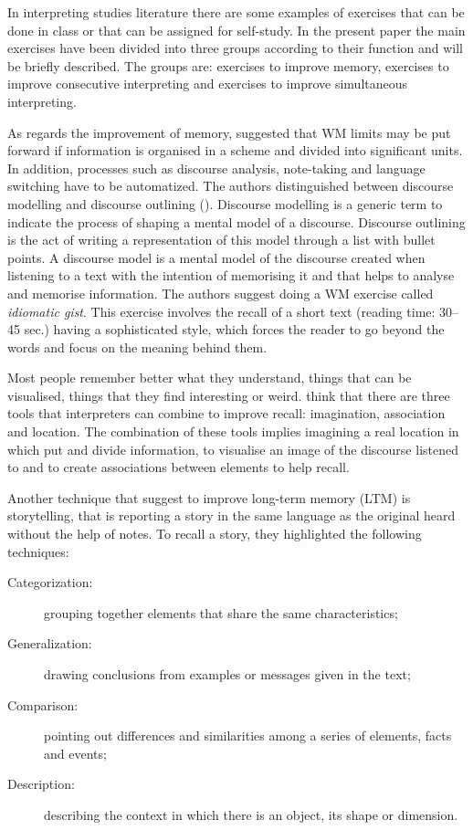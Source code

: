 \documentclass[output=paper]{../langscibook}
\begin{document}
In interpreting studies literature there are some examples of exercises that can be done in class or that can be assigned for self-study. In the present paper the main exercises have been divided into three groups according to their function and will be briefly described. The groups are: exercises to improve memory, exercises to improve consecutive interpreting and exercises to improve simultaneous interpreting.

As regards the improvement of memory, \citet{SettonDawrant2016b} suggested that WM limits may be put forward if information is organised in a scheme and divided into significant units. In addition, processes such as discourse analysis, note-taking and language switching have to be automatized. The authors distinguished between discourse modelling and discourse outlining (\citealt{SettonDawrant2016a}). Discourse modelling is a generic term to indicate the process of shaping a mental model of a discourse. Discourse outlining is the act of writing a representation of this model through a list with bullet points. A discourse model is a mental model of the discourse created when listening to a text with the intention of memorising it and that helps to analyse and memorise information. The authors suggest doing a WM  exercise called \emph{idiomatic gist}. This exercise involves the recall of a short text (reading time: 30--45 sec.) having a sophisticated style, which forces the reader to go beyond the words and focus on the meaning behind them.

Most people remember better what they understand, things that can be visualised, things that they find interesting or weird. \citet{YenkimalekivanHeuven2013,YenkimalekivanHeuven2017} think that there are three tools that interpreters can combine to improve recall: imagination, association and location. The combination of these tools implies imagining a real location in which put and divide information, to visualise an image of the discourse listened to and to create associations between elements to help recall.

Another technique that \citet{YenkimalekivanHeuven2013,YenkimalekivanHeuven2017} suggest to improve long-term memory (LTM) is storytelling, that is reporting a story in the same language as the original heard without the help of notes. To recall a story, they highlighted the following techniques:

\begin{description}
\item[Categorization:] grouping together elements that share the same characteristics;
\item[Generalization:] drawing conclusions from examples or messages given in the text;
\item[Comparison:] pointing out differences and similarities among a series of elements, facts and events;
\item[Description:] describing the context in which there is an object, its shape or dimension.
\end{description}
\end{document}

